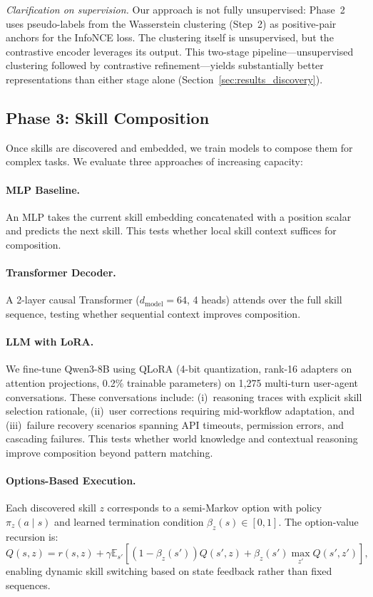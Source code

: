 \documentclass{article}
\begin{document}
\emph{Clarification on supervision.} Our approach is not fully unsupervised: Phase~2 uses pseudo-labels from the Wasserstein clustering (Step~2) as positive-pair anchors for the InfoNCE loss. The clustering itself is unsupervised, but the contrastive encoder leverages its output. This two-stage pipeline---unsupervised clustering followed by contrastive refinement---yields substantially better representations than either stage alone (Section~\ref{sec:results_discovery}).

\subsection{Phase 3: Skill Composition}

Once skills are discovered and embedded, we train models to compose them for complex tasks. We evaluate three approaches of increasing capacity:

\paragraph{MLP Baseline.} An MLP takes the current skill embedding concatenated with a position scalar and predicts the next skill. This tests whether local skill context suffices for composition.

\paragraph{Transformer Decoder.} A 2-layer causal Transformer ($d_{\text{model}}=64$, 4 heads) attends over the full skill sequence, testing whether sequential context improves composition.

\paragraph{LLM with LoRA.} We fine-tune Qwen3-8B using QLoRA (4-bit quantization, rank-16 adapters on attention projections, 0.2\% trainable parameters) on 1,275 multi-turn user-agent conversations. These conversations include: (i)~reasoning traces with explicit skill selection rationale, (ii)~user corrections requiring mid-workflow adaptation, and (iii)~failure recovery scenarios spanning API timeouts, permission errors, and cascading failures. This tests whether world knowledge and contextual reasoning improve composition beyond pattern matching.

\paragraph{Options-Based Execution.}
Each discovered skill $z$ corresponds to a semi-Markov option with policy $\pi_z(a \mid s)$ and learned termination condition $\beta_z(s) \in [0,1]$. The option-value recursion is:
\begin{equation}
Q(s, z) = r(s, z) + \gamma \mathbb{E}_{s'} \left[ (1 - \beta_z(s')) Q(s', z) + \beta_z(s') \max_{z'} Q(s', z') \right],
\end{equation}
enabling dynamic skill switching based on state feedback rather than fixed sequences.
\end{document}
